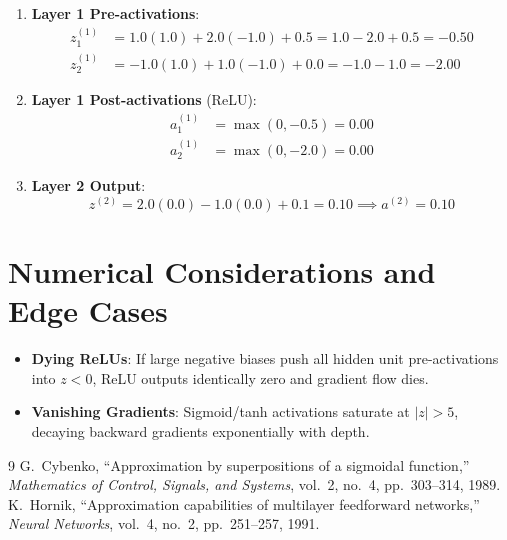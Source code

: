 \documentclass[11pt,a4paper]{article}
\theoremstyle{definition}
\begin{document}
\begin{enumerate}
    \item \textbf{Layer 1 Pre-activations}:
    \begin{align}
    z_1^{(1)} &= 1.0(1.0) + 2.0(-1.0) + 0.5 = 1.0 - 2.0 + 0.5 = -0.50 \\
    z_2^{(1)} &= -1.0(1.0) + 1.0(-1.0) + 0.0 = -1.0 - 1.0 = -2.00
    \end{align}
    \item \textbf{Layer 1 Post-activations} (ReLU):
    \begin{align}
    a_1^{(1)} &= \max(0, -0.5) = 0.00 \\
    a_2^{(1)} &= \max(0, -2.0) = 0.00
    \end{align}
    \item \textbf{Layer 2 Output}:
    \begin{equation}
    z^{(2)} = 2.0(0.0) - 1.0(0.0) + 0.1 = 0.10 \implies a^{(2)} = 0.10
    \end{equation}
\end{enumerate}

\section{Numerical Considerations and Edge Cases}

\begin{itemize}
    \item \textbf{Dying ReLUs}: If large negative biases push all hidden unit pre-activations into $z < 0$, ReLU outputs identically zero and gradient flow dies.
    \item \textbf{Vanishing Gradients}: Sigmoid/tanh activations saturate at $|z| > 5$, decaying backward gradients exponentially with depth.
\end{itemize}

\begin{thebibliography}{9}
 G.~Cybenko, ``Approximation by superpositions of a sigmoidal function,'' \emph{Mathematics of Control, Signals, and Systems}, vol.~2, no.~4, pp.~303--314, 1989.
 K.~Hornik, ``Approximation capabilities of multilayer feedforward networks,'' \emph{Neural Networks}, vol.~4, no.~2, pp.~251--257, 1991.
\end{thebibliography}
\end{document}
